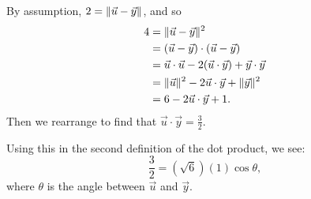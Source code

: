 \documentclass{workbook}
\begin{document}
\begin{slide}
\begin{parts}
\begin{solution}
				By assumption, $2=\lVert\vec u-\vec y\rVert$, and so
				\begin{align*}
					4 &= \lVert\vec u-\vec y\rVert^2\\
					&= (\vec u-\vec y)\cdot(\vec u-\vec y)\\
					&= \vec u\cdot\vec u - 2(\vec u\cdot\vec y) + \vec y\cdot\vec y\\
					&=\lVert\vec u\rVert^2 - 2\vec u\cdot\vec y + \lVert\vec y\rVert^2\\
					&=6 - 2\vec u\cdot\vec y + 1.
				\end{align*}
				Then we rearrange to find that $\vec u\cdot \vec y = \frac{3}{2}$.

				Using this in the second definition of the dot product, we see:
				\[
					\frac{3}{2} = \left(\sqrt{6}\right)(1) \cos \theta,
				\]
				where $\theta$ is the angle between $\vec u$ and $\vec y$.
			\end{solution}
	\end{parts}
\end{slide}
\end{document}
